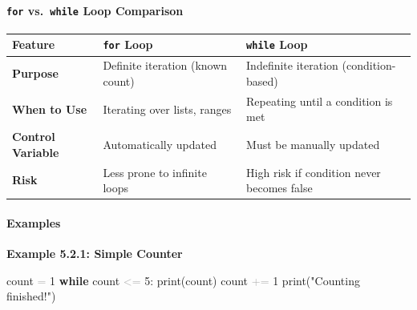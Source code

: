 \documentclass[
  justified,
  openright,
]{tufte-book}
\let\subsection\paragraph
\let\paragraph\paragraph
\newcommand{\KeywordTok}[1]{\textcolor{CodeKeyword}{\textbf{#1}}}  %
\newcommand{\StringTok}[1]{\textcolor{CodeString}{#1}}              %
\newcommand{\CodeNumTok}[1]{\textcolor{CodeNumber}{#1}}             %
\newcommand{\OperatorTok}[1]{\textcolor{DarkGray}{#1}}              %
\newenvironment{Shaded}{%
  \begin{mdframed}[style=TufteCode]%
}{%
  \end{mdframed}%
}
\let\subsection\paragraph
\let\paragraph\paragraph
\begin{document}
\subsection{\texorpdfstring{\texttt{for} vs.~\texttt{while} Loop
Comparison}{for vs.~while Loop Comparison}}\label{for-vs.-while-loop-comparison}

\begin{fullwidth}{\def\LTcaptype{none} %
\begin{longtable}[]{@{}
  >{\raggedright\arraybackslash}p{}
  >{\raggedright\arraybackslash}p{}
  >{\raggedright\arraybackslash}p{}@{}}
\toprule\noalign{}
\begin{minipage}[b]{\linewidth}\raggedright
Feature
\end{minipage} & \begin{minipage}[b]{\linewidth}\raggedright
\texttt{for} Loop
\end{minipage} & \begin{minipage}[b]{\linewidth}\raggedright
\texttt{while} Loop
\end{minipage} \\
\midrule\noalign{}
\endhead
\bottomrule\noalign{}
\endlastfoot
\textbf{Purpose} & Definite iteration (known count) & Indefinite
iteration (condition-based) \\
\textbf{When to Use} & Iterating over lists, ranges & Repeating until a
condition is met \\
\textbf{Control Variable} & Automatically updated & Must be manually
updated \\
\textbf{Risk} & Less prone to infinite loops & High risk if condition
never becomes false \\
\end{longtable}
}
\end{fullwidth}

\subsection{Examples}\label{examples-11}

\textbf{Example 5.2.1: Simple Counter}

\begin{Shaded}
\begin{Highlighting}[]
count \OperatorTok{=} \CodeNumTok{1}
\KeywordTok{while} count \OperatorTok{\textless{}=} \CodeNumTok{5}:
    print(count)
    count \OperatorTok{+=} \CodeNumTok{1}
print(\StringTok{"Counting finished!"})
\end{Highlighting}
\end{Shaded}
\end{document}

